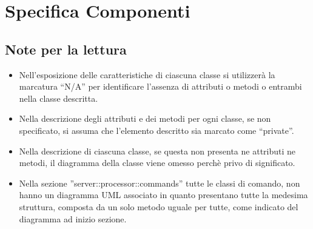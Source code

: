 %
%


\section{Specifica Componenti} %
\label{sec:specifica_componenti}

	\subsection{Note per la lettura} %
	\label{sub:note_specifica}
	\begin{itemize}
		\item Nell'esposizione delle caratteristiche di ciascuna classe si utilizzerà la marcatura ``N/A'' per identificare l'assenza di attributi o metodi o entrambi nella classe descritta.
		\item Nella descrizione degli attributi e dei metodi per ogni classe, se non specificato, si assuma che l'elemento descritto sia marcato come ``private''.
		\item Nella descrizione di ciascuna classe, se questa non presenta ne attributi ne metodi, il diagramma della classe viene omesso perchè privo di significato.
		\item Nella sezione ''server::processor::commands'' tutte le classi di comando, non hanno un diagramma UML associato in quanto presentano tutte la medesima struttura, composta da un solo metodo uguale per tutte, come indicato del diagramma ad inizio sezione.
	\end{itemize}

	\clearpage \newpage
	 \clearpage \newpage
	 \clearpage \newpage
	 \clearpage \newpage
